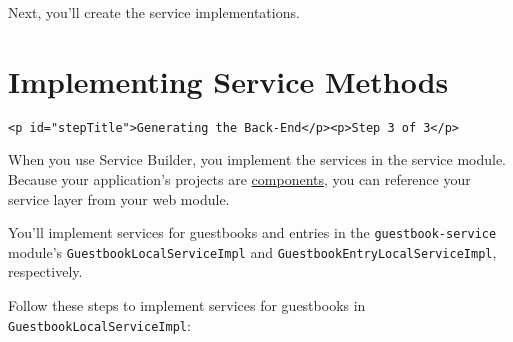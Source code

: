 Next, you'll create the service implementations.

\chapter{Implementing Service
Methods}\label{implementing-service-methods}

\begin{verbatim}
<p id="stepTitle">Generating the Back-End</p><p>Step 3 of 3</p>
\end{verbatim}

When you use Service Builder, you implement the services in the service
module. Because your application's projects are
\href{/docs/7-2/appdev/-/knowledge_base/a/invoking-local-services}{components},
you can reference your service layer from your web module.

You'll implement services for guestbooks and entries in the
\texttt{guestbook-service} module's \texttt{GuestbookLocalServiceImpl}
and \texttt{GuestbookEntryLocalServiceImpl}, respectively.

Follow these steps to implement services for guestbooks in
\texttt{GuestbookLocalServiceImpl}:


